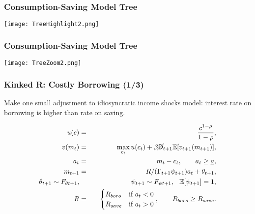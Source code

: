 \documentclass[public]{beamer}\beamerdefaultoverlayspecification{<+->}
\begin{document}
\begin{frame}\label{Recombination}
  \frametitle{Consumption-Saving Model Tree}
  \begin{center}
    \texttt{[image: TreeHighlight2.png]}
  \end{center}
\end{frame}

\begin{frame}
  \frametitle{Consumption-Saving Model Tree}
  \begin{center}
    \texttt{[image: TreeZoom2.png]}
  \end{center}
\end{frame}


\begin{frame}
  \frametitle{Kinked R: Costly Borrowing (1/3)}
  Make one small adjustment to idiosyncratic income shocks model: interest rate on borrowing is higher than rate on saving.

  \begin{eqnarray*}
    u(c) &=& \frac{c^{1-\rho}}{1-\rho}, \\
    v(m_t) &=& \max_{c_t} u(c_t) + \beta \cancel{\mathsf{D}}_{t+1} \mathbb{E} [v_{t+1}(m_{t+1}) ], \\
    a_t &=& m_t - c_t, \qquad a_t \geq \underline{a}, \\
    m_{t+1} &=& R/(\Gamma_{t+1} \psi_{t+1}) a_t + \theta_{t+1}, \\
    \theta_{t+1} \sim F_{\theta t+1}, &\qquad& \psi_{t+1} \sim F_{\psi t+1}, \hspace{0.25cm} \mathbb{E}[\psi_{t+1}] = 1, \\
    R &=& \begin{cases}
      R_{boro} & \text{if  } a_t < 0 \\
      R_{save} & \text{if  } a_t > 0
    \end{cases}, \qquad R_{boro} \geq R_{save}.
  \end{eqnarray*}
\end{frame}
\end{document}
